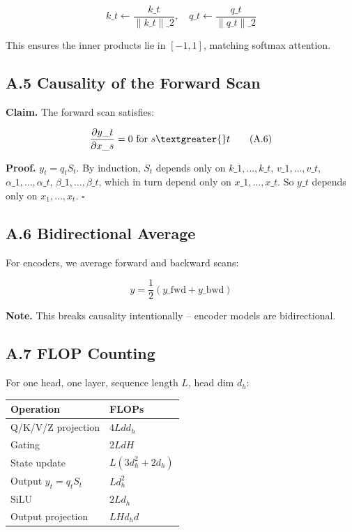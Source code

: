 \[
k\_t \leftarrow \frac{k\_t}{\|k\_t\|\_2}, \quad
q\_t \leftarrow \frac{q\_t}{\|q\_t\|\_2}
\tag{A.5}
\]

This ensures the inner products lie in $[-1, 1]$, matching softmax attention.

\subsection{A.5 Causality of the Forward Scan}

\textbf{Claim.} The forward scan satisfies:

\[
\frac{\partial y\_t}{\partial x\_s} = 0 \text{ for } s \textgreater{} t
\tag{A.6}
\]

\textbf{Proof.} $y_t = q_t S_t$. By induction, $S_t$ depends only on $k\_1, 
\dots, k\_t$, $v\_1, \dots, v\_t$, $\alpha\_1, \dots, \alpha\_t$, $\beta\_1, 
\dots, \beta\_t$, which in turn depend only on $x\_1, \dots, x\_t$. So $y\_t$ 
depends only on $x_1, \dots, x_t$. $\square$

\subsection{A.6 Bidirectional Average}

For encoders, we average forward and backward scans:

\[
y = \frac{1}{2}(y\_\text{fwd} + y\_\text{bwd})
\tag{A.7}
\]

\textbf{Note.} This breaks causality intentionally -- encoder models are 
bidirectional.

\subsection{A.7 FLOP Counting}

For one head, one layer, sequence length $L$, head dim $d_h$:

\begin{table}[H]
\centering
\small
\begin{tabular}{ll}
\toprule
\textbf{Operation} & \textbf{FLOPs} \\
\midrule
Q/K/V/Z projection & $4 L d d_h$ \\
Gating & $2 L d H$ \\
State update & $L (3 d_h^2 + 2 d_h)$ \\
Output $y_t = q_t S_t$ & $L d_h^2$ \\
SiLU & $2 L d_h$ \\
Output projection & $L H d_h d$ \\
\bottomrule
\end{tabular}
\end{table}

